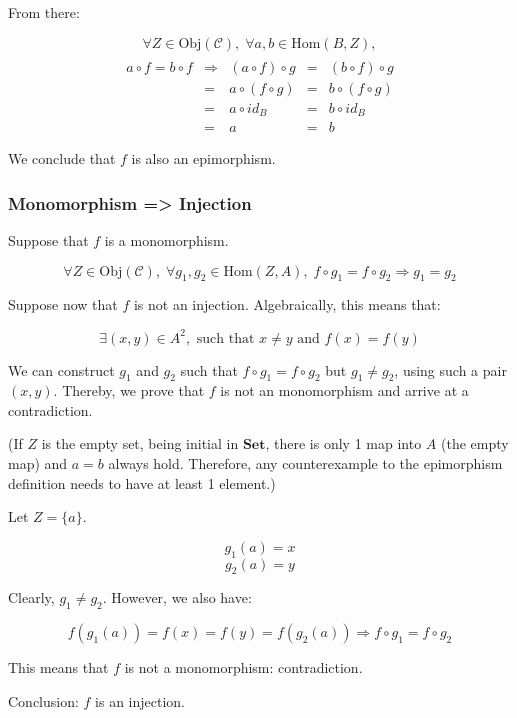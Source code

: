 From there:

$$
\forall Z \in \text{Obj}(\mathcal{C}), \;
\forall a, b \in \text{Hom}(B, Z),
$$
$$
\begin{array}{ccccc} \\
a \circ f = b \circ f & \Rightarrow & (a \circ  f) \circ g  &=& (b \circ  f) \circ g  \\
                      & =           &  a \circ (f  \circ g) &=&  b \circ (f  \circ g) \\
                      & =           &  a \circ  id_B        &=&  b \circ  id_B        \\
                      & =           &  a                    &=&  b
\end{array}
$$

We conclude that $f$ is also an epimorphism.


\subsubsection*{Monomorphism => Injection}

Suppose that $f$ is a monomorphism.

$$
\forall Z \in \text{Obj}(\mathcal{C}), \;
\forall g_1, g_2 \in \text{Hom}(Z, A), \;
f \circ g_1 = f \circ g_2 \Rightarrow g_1 = g_2
$$

Suppose now that $f$ is not an injection. Algebraically, this means that:

$$\exists (x, y) \in A^2, \text{ such that } x \neq y \text{ and } f(x) = f(y)$$

We can construct $g_1$ and $g_2$ such that $f \circ g_1 = f \circ g_2$ but $g_1 \neq g_2$, using such a pair $(x, y)$. Thereby, we prove that $f$ is not an monomorphism and arrive at a contradiction.

(If $Z$ is the empty set, being initial in $\mathbf{Set}$, there is only 1 map into $A$ (the empty map) and $a = b$ always hold. Therefore, any counterexample to the epimorphism definition needs to have at least 1 element.)

Let $Z = \{a\}$.

$$g_1(a) = x$$
$$g_2(a) = y$$

Clearly, $g_1 \neq g_2$. However, we also have:

$$
f(g_1(a)) = f(x) = f(y) = f(g_2(a)) \Rightarrow
f \circ g_1 = f \circ g_2
$$

This means that $f$ is not a monomorphism: contradiction.

Conclusion: $f$ is an injection.


